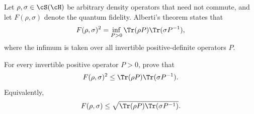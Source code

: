 Let $\rho,\sigma\in \cS(\cH)$ be arbitrary density operators that need not commute, and let $F(\rho,\sigma)$ denote the quantum fidelity. Alberti's theorem states that
$$
F(\rho,\sigma)^2
=
\inf_{P>0}
\Tr(\rho P)\Tr(\sigma P^{-1}),
$$
where the infimum is taken over all invertible positive-definite operators $P$.

For every invertible positive operator $P>0$, prove that
$$
F(\rho,\sigma)^2
\leq
\Tr(\rho P)\Tr(\sigma P^{-1}).
$$
Equivalently,
$$
F(\rho,\sigma)
\leq
\sqrt{\Tr(\rho P)\Tr(\sigma P^{-1})}.
$$
